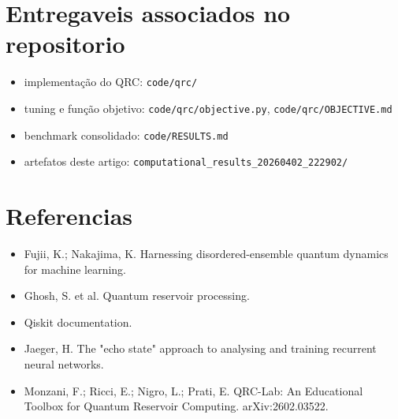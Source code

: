 \documentclass[12pt]{article}
\providecommand{\tightlist}{%
          \setlength{\itemsep}{0pt}\setlength{\parskip}{0pt}}
\begin{document}
\section{Entregaveis associados no repositorio}\label{entregaveis-associados-no-repositorio}

\begin{itemize}
\tightlist
\item
  implementação do QRC: \texttt{code/qrc/}
\item
  tuning e função objetivo: \texttt{code/qrc/objective.py}, \texttt{code/qrc/OBJECTIVE.md}
\item
  benchmark consolidado: \texttt{code/RESULTS.md}
\item
  artefatos deste artigo: \texttt{computational\_results\_20260402\_222902/}
\end{itemize}

\section{Referencias}\label{referencias}

\begin{itemize}
\tightlist
\item
  Fujii, K.; Nakajima, K. Harnessing disordered-ensemble quantum dynamics for machine learning.
\item
  Ghosh, S. et al. Quantum reservoir processing.
\item
  Qiskit documentation.
\item
  Jaeger, H. The "echo state" approach to analysing and training recurrent neural networks.
\item
  Monzani, F.; Ricci, E.; Nigro, L.; Prati, E. QRC-Lab: An Educational Toolbox for Quantum Reservoir Computing. arXiv:2602.03522.
\end{itemize}

        
\end{document}
